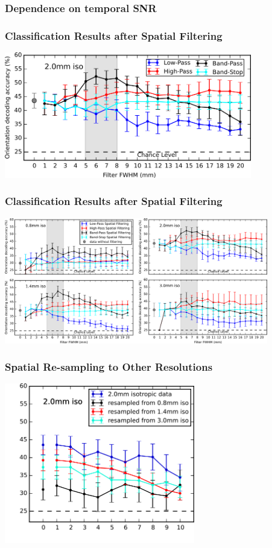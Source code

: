 \documentclass{beamer}
\begin{document}
  \begin{frame}
    \frametitle{Dependence on temporal SNR}

    \end{frame}    

  \begin{frame}
    \frametitle{Classification Results after Spatial Filtering}
        \begin{center}
            \includegraphics[height=5.5cm]{pics/spatial_smoothing}
        \end{center}
    \end{frame} 

  \begin{frame}
    \frametitle{Classification Results after Spatial Filtering}
        \begin{center}
            \includegraphics[height=5.5cm]{pics/spatial_smoothing_multires}
        \end{center}
    \end{frame} 

  \begin{frame}
    \frametitle{Spatial Re-sampling to Other Resolutions}
        \begin{center}
            \includegraphics[height=7cm]{pics/resampling}
        \end{center}
    \end{frame}
\end{document}
